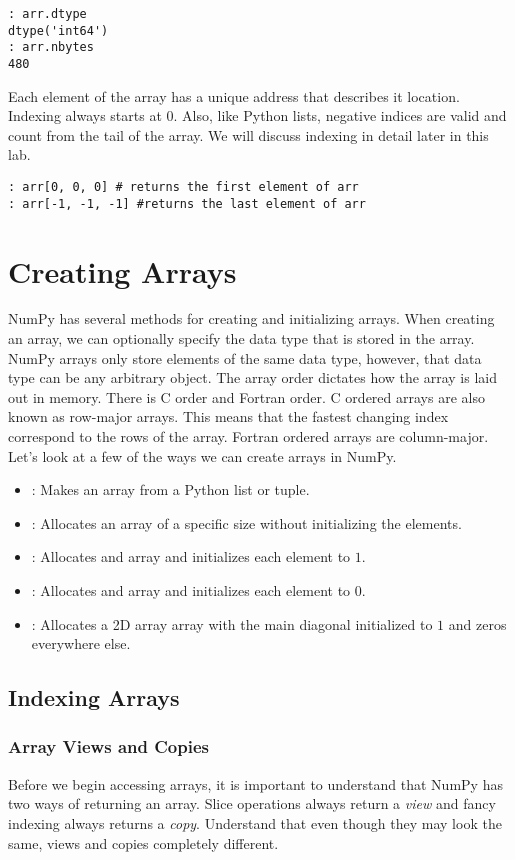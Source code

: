 \begin{lstlisting}
: arr.dtype
dtype('int64')
: arr.nbytes
480
\end{lstlisting}

Each element of the array has a unique address that describes it location.  Indexing always starts at $0$.  Also, like Python lists, negative indices are valid and count from the tail of the array.  We will discuss indexing in detail later in this lab.

\begin{lstlisting}
: arr[0, 0, 0] # returns the first element of arr
: arr[-1, -1, -1] #returns the last element of arr
\end{lstlisting}

\section*{Creating Arrays}
NumPy has several methods for creating and initializing arrays.  When creating an array, we can optionally specify the data type that is stored in the array.  NumPy arrays only store elements of the same data type, however, that data type can be any arbitrary object.  The array order dictates how the array is laid out in memory.  There is C order and Fortran order.  C ordered arrays are also known as row-major arrays.  This means that the fastest changing index correspond to the rows of the array.  Fortran ordered arrays are column-major.  Let's look at a few of the ways we can create arrays in NumPy.
\begin{itemize}
\item {}: Makes an array from a Python list or tuple.
\item {}: Allocates an array of a specific size without initializing the elements.
\item {}: Allocates and array and initializes each element to $1$.
\item {}: Allocates and array and initializes each element to $0$.
\item {}: Allocates a 2D array array with the main diagonal initialized to $1$ and zeros everywhere else.
\end{itemize}

\subsection*{Indexing Arrays}
\subsubsection*{Array Views and Copies}
Before we begin accessing arrays, it is important to understand that NumPy has two ways of returning an array.  Slice operations always return a \emph{view} and fancy indexing always returns a \emph{copy}.  Understand that even though they may look the same, views and copies completely different.

